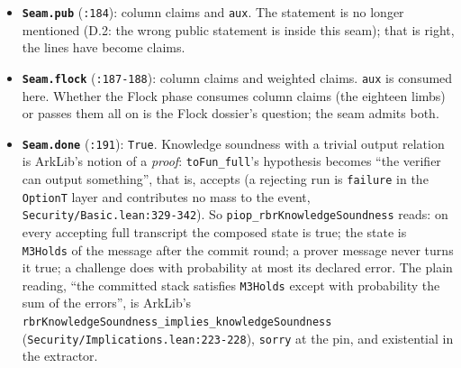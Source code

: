 \begin{itemize}
\item \textbf{\texttt{Seam.\allowbreak{}pub}} (\texttt{:184}): column claims and \texttt{aux}. The statement is no longer mentioned (D.2: the wrong public statement is inside this seam); that is right, the lines have become claims.
\item \textbf{\texttt{Seam.\allowbreak{}flock}} (\texttt{:187-{}188}): column claims and weighted claims. \texttt{aux} is consumed here. Whether the Flock phase consumes column claims (the eighteen limbs) or passes them all on is the Flock dossier's question; the seam admits both.
\item \textbf{\texttt{Seam.\allowbreak{}done}} (\texttt{:191}): \texttt{True}. Knowledge soundness with a trivial output relation is ArkLib's notion of a \emph{proof}: \texttt{toFun\_\allowbreak{}full}'s hypothesis becomes \enquote{the verifier can output something}, that is, accepts (a rejecting run is \texttt{failure} in the \texttt{OptionT} layer and contributes no mass to the event, \texttt{Security/\allowbreak{}Basic.\allowbreak{}lean:329-{}342}). So \texttt{piop\_\allowbreak{}rbrKnowledgeSoundness} reads: on every accepting full transcript the composed state is true; the state is \texttt{M3Holds} of the message after the commit round; a prover message never turns it true; a challenge does with probability at most its declared error. The plain reading, \enquote{the committed stack satisfies \texttt{M3Holds} except with probability the sum of the errors}, is ArkLib's \texttt{r\allowbreak{}b\allowbreak{}r\allowbreak{}K\allowbreak{}n\allowbreak{}o\allowbreak{}w\allowbreak{}l\allowbreak{}e\allowbreak{}d\allowbreak{}g\allowbreak{}e\allowbreak{}S\allowbreak{}o\allowbreak{}u\allowbreak{}n\allowbreak{}d\allowbreak{}n\allowbreak{}e\allowbreak{}s\allowbreak{}s\allowbreak{}\_\allowbreak{}i\allowbreak{}m\allowbreak{}p\allowbreak{}l\allowbreak{}i\allowbreak{}e\allowbreak{}s\allowbreak{}\_\allowbreak{}k\allowbreak{}n\allowbreak{}o\allowbreak{}w\allowbreak{}l\allowbreak{}e\allowbreak{}d\allowbreak{}g\allowbreak{}e\allowbreak{}S\allowbreak{}o\allowbreak{}u\allowbreak{}n\allowbreak{}d\allowbreak{}n\allowbreak{}e\allowbreak{}s\allowbreak{}s} (\texttt{S\allowbreak{}e\allowbreak{}c\allowbreak{}u\allowbreak{}r\allowbreak{}i\allowbreak{}t\allowbreak{}y\allowbreak{}/\allowbreak{}I\allowbreak{}m\allowbreak{}p\allowbreak{}l\allowbreak{}i\allowbreak{}c\allowbreak{}a\allowbreak{}t\allowbreak{}i\allowbreak{}o\allowbreak{}n\allowbreak{}s\allowbreak{}.\allowbreak{}l\allowbreak{}e\allowbreak{}a\allowbreak{}n\allowbreak{}:\allowbreak{}2\allowbreak{}2\allowbreak{}3\allowbreak{}-{}\allowbreak{}2\allowbreak{}2\allowbreak{}8}), \texttt{sorry} at the pin, and existential in the extractor.
\end{itemize}

